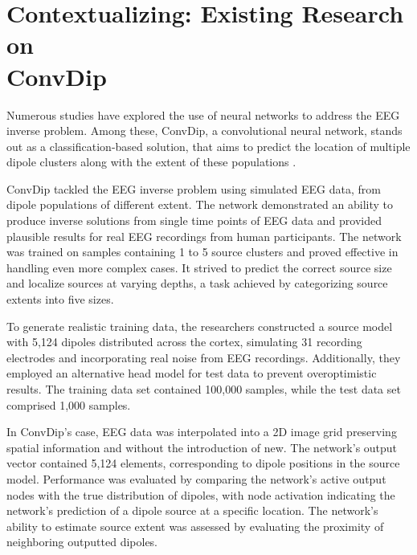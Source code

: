 \documentclass[a4paper, UKenglish, 11pt]{uiomaster}
\begin{document}
\section{Contextualizing: Existing Research on \\ ConvDip} \label{sec:convdip}

Numerous studies have explored the use of neural networks to address the EEG inverse problem. Among these, ConvDip, a convolutional neural network, stands out as a classification-based solution, that aims to predict the location of multiple dipole clusters along with the extent of these populations \cite{hecker2021convdip}.

ConvDip tackled the EEG inverse problem using simulated EEG data, from dipole populations of different extent. The network demonstrated an ability to produce inverse solutions from single time points of EEG data and provided plausible results for real EEG recordings from human participants. The network was trained on samples containing 1 to 5 source clusters and proved effective in handling even more complex cases. It strived to predict the correct source size and localize sources at varying depths, a task achieved by categorizing source extents into five sizes.

To generate realistic training data, the researchers constructed a source model with 5,124 dipoles distributed across the cortex, simulating 31 recording electrodes and incorporating real noise from EEG recordings. Additionally, they employed an alternative head model for test data to prevent overoptimistic results. The training data set contained 100,000 samples, while the test data set comprised 1,000 samples.

In ConvDip's case, EEG data was interpolated into a 2D image grid preserving spatial information and without the introduction of new. The network's output vector contained 5,124 elements, corresponding to dipole positions in the source model. Performance was evaluated by comparing the network's active output nodes with the true distribution of dipoles, with node activation indicating the network's prediction of a dipole source at a specific location. The network's ability to estimate source extent was assessed by evaluating the proximity of neighboring outputted dipoles.
\end{document}
